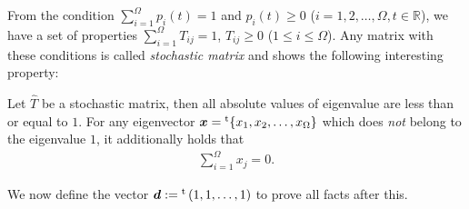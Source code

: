 From the condition $\sum_{i=1}^{\Omega}p_{i}(t)=1$ and $p_{i}(t) \ge 0$ ($i=1,2,\dots,\Omega, t\in\mathbb{R}$), we have a set of properties $\sum_{i=1}^{\Omega}T_{ij} = 1$, $T_{ij}\ge 0$ ($1\leq i\leq \Omega$). Any matrix with these conditions is called \textit{stochastic matrix} and shows the following interesting property:
\begin{theorem}
	Let $\hat{T}$ be a stochastic matrix, then all absolute values of eigenvalue are less than or equal to $1$. For any eigenvector $\bm{x}={}^{\rm t}\{x_{1},x_{2},\dots,x_{\Omega}\}$ which does \textit{not} belong to the eigenvalue $1$, it additionally holds that
	\begin{align}
	\sum_{i=1}^{\Omega}x_{j}=0.
	\end{align}
\end{theorem}
We now define the vector $\bm{d}:={}^{\rm t}\left(1,1,\dots,1\right)$ to prove all facts after this.
